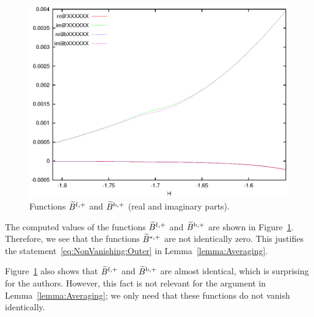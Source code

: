 \begin{figure}
\includegraphics{figs/tildeB}
\caption{Functions $\widetilde B^{\mathrm{f},+}$ and $\widetilde B^{\mathrm{b},+}$ (real and
imaginary parts).}
\label{fig:tildeB}
\end{figure}

The computed values of the functions $\widetilde B^{\mathrm{f},+}$ and $\widetilde
B^{\mathrm{b},+}$ are shown in Figure~\ref{fig:tildeB}.
Therefore, we see that the functions $\widetilde B^{\ast,+}$ are not
identically zero.
This justifies the statement~\eqref{eq:NonVanishing:Outer} in
Lemma~\ref{lemma:Averaging}.

\begin{remark}
Figure~\ref{fig:tildeB} also shows that $\widetilde B^{\mathrm{f},+}$ and $\widetilde
B^{\mathrm{b},+}$ are almost identical, which is surprising for the authors.
However, this fact is not relevant for the argument in
Lemma~\ref{lemma:Averaging}; we only need that these functions do not
vanish identically.
\end{remark}
